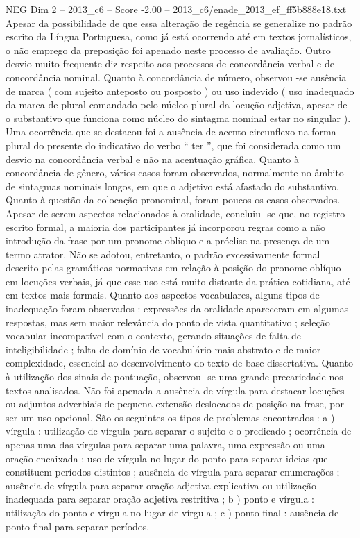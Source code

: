 \begin{textsample}{NEG Dim 2 – 2013\_c6 – Score -2.00 – 2013\_c6/enade\_2013\_ef\_ff5b888e18.txt}
Apesar da possibilidade de que essa alteração de regência se generalize no padrão escrito da Língua Portuguesa, como já está ocorrendo até em textos jornalísticos, o não emprego da preposição foi apenado neste processo de avaliação.
Outro desvio muito frequente diz respeito aos processos de concordância verbal e de concordância nominal.
Quanto à concordância de número, observou -se ausência de marca ( com sujeito anteposto ou posposto ) ou uso indevido ( uso inadequado da marca de plural comandado pelo núcleo plural da locução adjetiva, apesar de o substantivo que funciona como núcleo do sintagma nominal estar no singular ).
Uma ocorrência que se destacou foi a ausência de acento circunflexo na forma plural do presente do indicativo do verbo “ ter ”, que foi considerada como um desvio na concordância verbal e não na acentuação gráfica.
Quanto à concordância de gênero, vários casos foram observados, normalmente no âmbito de sintagmas nominais longos, em que o adjetivo está afastado do substantivo.
Quanto à questão da colocação pronominal, foram poucos os casos observados.
Apesar de serem aspectos relacionados à oralidade, concluiu -se que, no registro escrito formal, a maioria dos participantes já incorporou regras como a não introdução da frase por um pronome oblíquo e a próclise na presença de um termo atrator.
Não se adotou, entretanto, o padrão excessivamente formal descrito pelas gramáticas normativas em relação à posição do pronome oblíquo em locuções verbais, já que esse uso está muito distante da prática cotidiana, até em textos mais formais.
Quanto aos aspectos vocabulares, alguns tipos de inadequação foram observados : expressões da oralidade apareceram em algumas respostas, mas sem maior relevância do ponto de vista quantitativo ; seleção vocabular incompatível com o contexto, gerando situações de falta de inteligibilidade ; falta de domínio de vocabulário mais abstrato e de maior complexidade, essencial ao desenvolvimento do texto de base dissertativa.
Quanto à utilização dos sinais de pontuação, observou -se uma grande precariedade nos textos analisados.
Não foi apenada a ausência de vírgula para destacar locuções ou adjuntos adverbiais de pequena extensão deslocados de posição na frase, por ser um uso opcional.
São os seguintes os tipos de problemas encontrados : a ) vírgula : utilização de vírgula para separar o sujeito e o predicado ; ocorrência de apenas uma das vírgulas para separar uma palavra, uma expressão ou uma oração encaixada ; uso de vírgula no lugar do ponto para separar ideias que constituem períodos distintos ; ausência de vírgula para separar enumerações ; ausência de vírgula para separar oração adjetiva explicativa ou utilização inadequada para separar oração adjetiva restritiva ; b ) ponto e vírgula : utilização do ponto e vírgula no lugar de vírgula ; c ) ponto final : ausência de ponto final para separar períodos.

\end{textsample}
